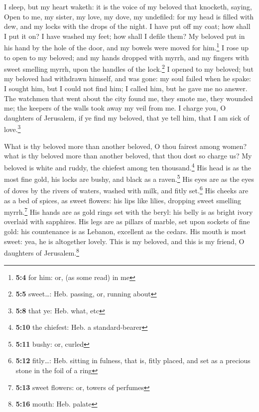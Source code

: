  I sleep, but my heart waketh: it is the voice of my
beloved that knocketh, saying, Open to me, my sister, my love, my dove,
my undefiled: for my head is filled with dew, and my locks with the
drops of the night.  I have put off my coat; how shall I
put it on? I have washed my feet; how shall I defile them?
 My beloved put in his hand by the hole of the door, and
my bowels were moved for him.\footnote{\textbf{5:4} for him: or, (as
  some read) in me}  I rose up to open to my beloved; and
my hands dropped with myrrh, and my fingers with sweet smelling myrrh,
upon the handles of the lock.\footnote{\textbf{5:5} sweet\ldots: Heb.
  passing, or, running about}  I opened to my beloved; but
my beloved had withdrawn himself, and was gone: my soul failed when he
spake: I sought him, but I could not find him; I called him, but he gave
me no answer.  The watchmen that went about the city found
me, they smote me, they wounded me; the keepers of the walls took away
my veil from me.  I charge you, O daughters of Jerusalem,
if ye find my beloved, that ye tell him, that I am sick of
love.\footnote{\textbf{5:8} that ye: Heb. what, etc}

 What is thy beloved more than another beloved, O thou
fairest among women? what is thy beloved more than another beloved, that
thou dost so charge us?  My beloved is white and ruddy,
the chiefest among ten thousand.\footnote{\textbf{5:10} the chiefest:
  Heb. a standard-bearer}  His head is as the most fine
gold, his locks are bushy, and black as a raven.\footnote{\textbf{5:11}
  bushy: or, curled}  His eyes are as the eyes of doves
by the rivers of waters, washed with milk, and fitly set.\footnote{\textbf{5:12}
  fitly\ldots: Heb. sitting in fulness, that is, fitly placed, and set
  as a precious stone in the foil of a ring}  His cheeks
are as a bed of spices, as sweet flowers: his lips like lilies, dropping
sweet smelling myrrh.\footnote{\textbf{5:13} sweet flowers: or, towers
  of perfumes}  His hands are as gold rings set with the
beryl: his belly is as bright ivory overlaid with sapphires.
 His legs are as pillars of marble, set upon sockets of
fine gold: his countenance is as Lebanon, excellent as the cedars.
 His mouth is most sweet: yea, he is altogether lovely.
This is my beloved, and this is my friend, O daughters of
Jerusalem.\footnote{\textbf{5:16} mouth: Heb. palate}

